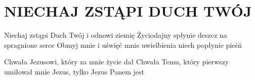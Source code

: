 \documentclass[../../../songbook.tex]{subfiles}
\begin{document}
\TabPositions{9cm} %
\section*{NIECHAJ ZSTĄPI DUCH TWÓJ}
{}
\vspace{0.5cm}
Niechaj zstąpi Duch Twój i odnowi ziemię			 \newline
Życiodajny spłynie deszcz na spragnione serce		 \newline
Obmyj mnie i uświęć mnie							 \newline
uwielbienia niech popłynie pieśń					 \newline

\-\hspace{1cm} Chwała Jezusowi, który za mnie życie dał		 \newline
\-\hspace{1cm} Chwała Temu, który pierwszy umiłował mnie	 \newline
\-\hspace{1cm} Jezus, tylko Jezus Panem jest				 \newline
\end{document}
